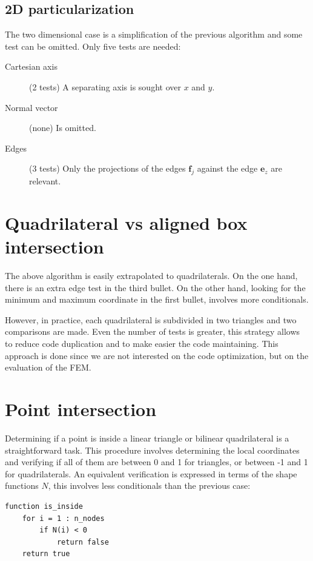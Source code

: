 \subsection{2D particularization}

The two dimensional case is a simplification of the previous algorithm and some test can be omitted. Only five tests are needed:
\begin{description}
    \item[Cartesian axis] (2 tests) A separating axis is sought over $x$ and $y$.
    \item[Normal vector] (none) Is omitted.
    \item[Edges] (3 tests) Only the projections of the edges $\mathbf{f}_j$ against the edge $\mathbf{e}_z$ are relevant.
\end{description}



\section{Quadrilateral vs aligned box intersection}

The above algorithm is easily extrapolated to quadrilaterals. On the one hand, there is an extra edge test in the third bullet. On the other hand, looking for the minimum and maximum coordinate in the first bullet, involves more conditionals.

However, in practice, each quadrilateral is subdivided in two triangles and two comparisons are made. Even the number of tests is greater, this strategy allows to reduce code duplication and to make easier the code maintaining. This approach is done since we are not interested on the code optimization, but on the evaluation of the FEM. 



\section{Point intersection}

Determining if a point is inside a linear triangle or bilinear quadrilateral is a straightforward task. This procedure involves determining the local coordinates and verifying if all of them are between 0 and 1 for triangles, or between -1 and 1 for quadrilaterals.
An equivalent verification is expressed in terms of the shape functions $N$, this involves less conditionals than the previous case:
\begin{verbatim}
function is_inside
    for i = 1 : n_nodes
        if N(i) < 0
            return false
    return true
\end{verbatim}



